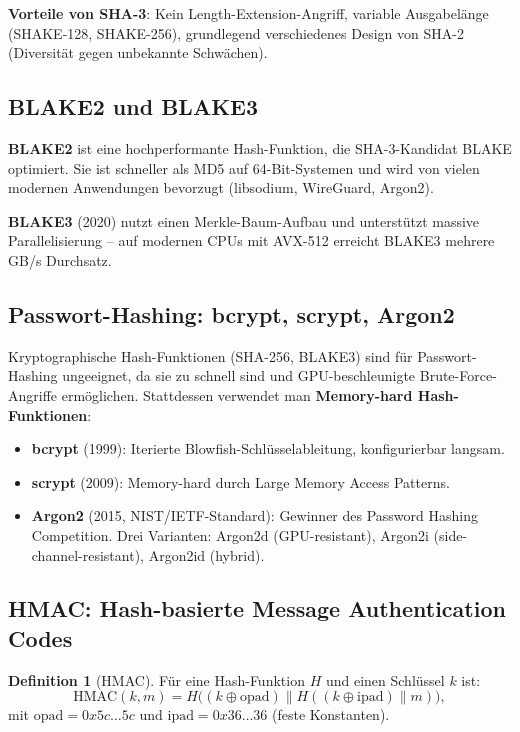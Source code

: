﻿\documentclass[a4paper,12pt]{scrreprt}
\theoremstyle{definition}
\newtheorem{definition}{Definition}[section]
\begin{document}
\textbf{Vorteile von SHA-3}: Kein Length-Extension-Angriff, variable Ausgabelänge (SHAKE-128, SHAKE-256), grundlegend verschiedenes Design von SHA-2 (Diversität gegen unbekannte Schwächen).

\subsection{BLAKE2 und BLAKE3}

\textbf{BLAKE2} ist eine hochperformante Hash-Funktion, die SHA-3-Kandidat BLAKE optimiert. Sie ist schneller als MD5 auf 64-Bit-Systemen und wird von vielen modernen Anwendungen bevorzugt (libsodium, WireGuard, Argon2).

\textbf{BLAKE3} (2020) nutzt einen Merkle-Baum-Aufbau und unterstützt massive Parallelisierung -- auf modernen CPUs mit AVX-512 erreicht BLAKE3 mehrere GB/s Durchsatz.

\subsection{Passwort-Hashing: bcrypt, scrypt, Argon2}

Kryptographische Hash-Funktionen (SHA-256, BLAKE3) sind für Passwort-Hashing ungeeignet, da sie zu schnell sind und GPU-beschleunigte Brute-Force-Angriffe ermöglichen. Stattdessen verwendet man \textbf{Memory-hard Hash-Funktionen}:

\begin{itemize}
    \item \textbf{bcrypt} (1999): Iterierte Blowfish-Schlüsselableitung, konfigurierbar langsam.
    \item \textbf{scrypt} (2009): Memory-hard durch Large Memory Access Patterns.
    \item \textbf{Argon2} (2015, NIST/IETF-Standard): Gewinner des Password Hashing Competition. Drei Varianten: Argon2d (GPU-resistant), Argon2i (side-channel-resistant), Argon2id (hybrid).
\end{itemize}

\subsection{HMAC: Hash-basierte Message Authentication Codes}

\begin{definition}[HMAC]
Für eine Hash-Funktion $H$ und einen Schlüssel $k$ ist:
\[
\mathrm{HMAC}(k, m) = H\bigl((k \oplus \mathrm{opad}) \| H((k \oplus \mathrm{ipad}) \| m)\bigr),
\]
mit $\mathrm{opad} = 0x5c\ldots5c$ und $\mathrm{ipad} = 0x36\ldots36$ (feste Konstanten).
\end{definition}
\end{document}
